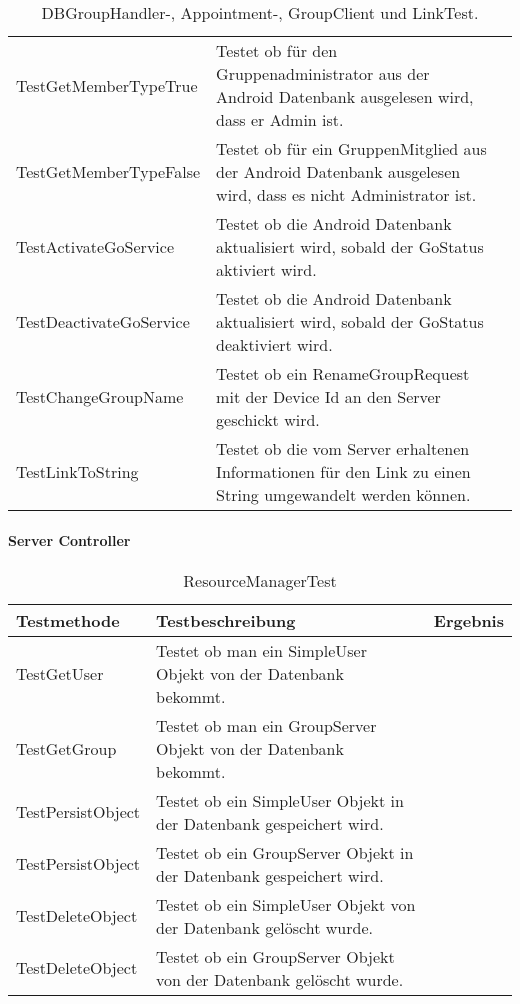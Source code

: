 \begin{table}[H]
{\begin{tabular}{|p{}|p{}|>{\centering}p{}|}
				\hspace{0pt}TestGetMemberTypeTrue & Testet ob für den Gruppenadministrator aus der Android Datenbank ausgelesen wird, dass er Admin ist. & \checkmark\tabularnewline
				\hspace{0pt}TestGetMemberTypeFalse & Testet ob für ein GruppenMitglied aus der Android Datenbank ausgelesen wird, dass es nicht Administrator ist. & \checkmark\tabularnewline
				\hspace{0pt}TestActivateGoService & Testet ob die Android Datenbank aktualisiert wird, sobald der GoStatus aktiviert wird. & \checkmark\tabularnewline
				\hspace{0pt}TestDeactivateGoService & Testet ob die Android Datenbank aktualisiert wird, sobald der GoStatus deaktiviert wird. & \checkmark\tabularnewline
				\hspace{0pt}TestChangeGroupName & Testet ob ein RenameGroupRequest mit der Device Id an den Server geschickt wird. & \checkmark\tabularnewline
				\hspace{0pt}TestLinkToString & Testet ob die vom Server erhaltenen Informationen für den Link zu einen String umgewandelt werden können. & \checkmark\tabularnewline
				\hline
			\end{tabular}}
			\caption{DBGroupHandler-, Appointment-, GroupClient und LinkTest.}
		\end{table}
		
		
		
		\paragraph{Server Controller}
		\begin{table}[H]
			{
				\begin{tabular}{|p{}|p{}|>{\centering}p{}|}
					\hline
					Testmethode & Testbeschreibung & Ergebnis\tabularnewline
					\hline
					\hspace{0pt}TestGetUser & Testet ob man ein SimpleUser Objekt von der Datenbank bekommt. &	\checkmark\tabularnewline
					\hspace{0pt}TestGetGroup & Testet ob man ein GroupServer Objekt von der Datenbank bekommt. &	\checkmark\tabularnewline
					\hspace{0pt}TestPersistObject & Testet ob ein SimpleUser Objekt in der Datenbank gespeichert wird. &	\checkmark\tabularnewline
					\hspace{0pt}TestPersistObject & Testet ob ein GroupServer Objekt in der Datenbank gespeichert wird. &	\checkmark\tabularnewline
					\hspace{0pt}TestDeleteObject & Testet ob ein SimpleUser Objekt von der Datenbank gelöscht wurde. &	\checkmark\tabularnewline
					\hspace{0pt}TestDeleteObject & Testet ob ein GroupServer Objekt von der Datenbank gelöscht wurde. &	\checkmark\tabularnewline
					\hline
				\end{tabular}}
				\caption{ResourceManagerTest}
			\end{table}
		
